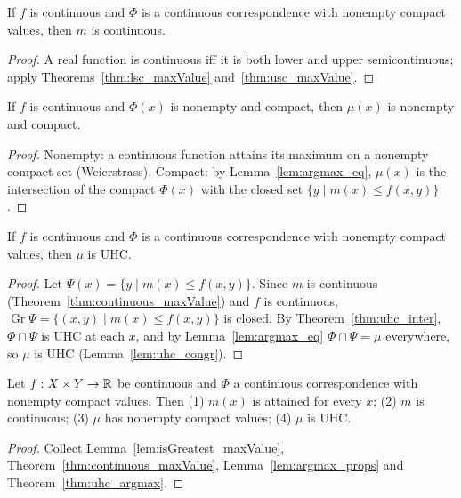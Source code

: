 \begin{theorem}
\label{thm:continuous_maxValue}
\leanok
{}
If $f$ is continuous and $\Phi$ is a continuous correspondence with nonempty compact values, then $m$ is
continuous.
\end{theorem}
\begin{proof}
\leanok
A real function is continuous iff it is both lower and upper semicontinuous; apply
Theorems~\ref{thm:lsc_maxValue} and~\ref{thm:usc_maxValue}.
\end{proof}

\begin{lemma}
\label{lem:argmax_props}
\leanok
{}
If $f$ is continuous and $\Phi(x)$ is nonempty and compact, then $\mu(x)$ is nonempty and compact.
\end{lemma}
\begin{proof}
\leanok
Nonempty: a continuous function attains its maximum on a nonempty compact set (Weierstrass).
Compact: by Lemma~\ref{lem:argmax_eq}, $\mu(x)$ is the intersection of the compact $\Phi(x)$ with the
closed set $\{y \mid m(x) \le f(x, y)\}$.
\end{proof}

\begin{theorem}
\label{thm:uhc_argmax}
\leanok
{}
If $f$ is continuous and $\Phi$ is a continuous correspondence with nonempty compact values, then $\mu$
is UHC.
\end{theorem}
\begin{proof}
\leanok
Let $\Psi(x) = \{y \mid m(x) \le f(x, y)\}$. Since $m$ is continuous
(Theorem~\ref{thm:continuous_maxValue}) and $f$ is continuous, $\operatorname{Gr}\Psi =
\{(x, y) \mid m(x) \le f(x, y)\}$ is closed. By Theorem~\ref{thm:uhc_inter}, $\Phi \cap \Psi$ is UHC at
each $x$, and by Lemma~\ref{lem:argmax_eq} $\Phi \cap \Psi = \mu$ everywhere, so $\mu$ is UHC
(Lemma~\ref{lem:uhc_congr}).
\end{proof}

\begin{theorem}
\label{thm:berge}
\leanok
{}
Let $f : X \times Y \to \mathbb{R}$ be continuous and $\Phi$ a continuous correspondence with nonempty compact
values. Then (1) $m(x)$ is attained for every $x$; (2) $m$ is continuous; (3) $\mu$ has nonempty compact
values; (4) $\mu$ is UHC.
\end{theorem}
\begin{proof}
\leanok
Collect Lemma~\ref{lem:isGreatest_maxValue}, Theorem~\ref{thm:continuous_maxValue},
Lemma~\ref{lem:argmax_props} and Theorem~\ref{thm:uhc_argmax}.
\end{proof}

